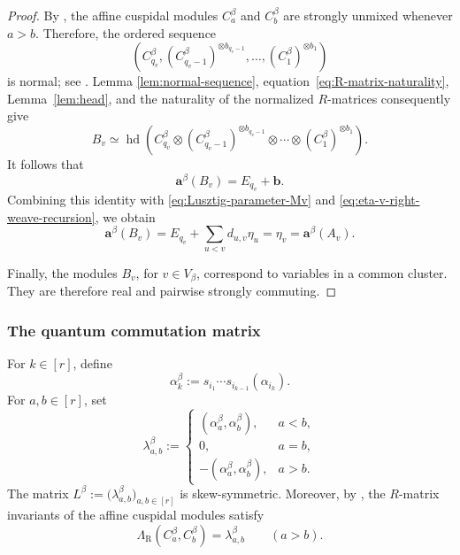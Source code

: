 \documentclass[12pt, reqno]{amsart}
\theoremstyle{plain}
\theoremstyle{definition}
\numberwithin{equation}{section}
\newcommand{\LambdaR}{\Lambda_{\mathrm R}}
\begin{document}
\begin{proof}
By \cite[Theorem~5.16]{kashiwara2025monoidal}, the affine cuspidal
modules \(C_a^\beta\) and \(C_b^\beta\) are strongly unmixed whenever
\(a>b\). Therefore, the ordered sequence
\begin{equation*}
    \left(
        C_{q_v}^\beta,
        (C_{q_v-1}^\beta)^{\otimes b_{q_v-1}},
        \ldots,
        (C_1^\beta)^{\otimes b_1}
    \right)
\end{equation*}
is normal; see
\cite[Proposition~1.14]{kashiwara2025monoidal}. Lemma \ref{lem:normal-sequence}, equation~\eqref{eq:R-matrix-naturality}, Lemma~\ref{lem:head},
and the naturality of the normalized \(R\)-matrices consequently give
\begin{equation}\label{eq:PBW-realization-Bv}
    B_v
    \simeq
    \operatorname{hd}\left(
        C_{q_v}^\beta
        \otimes
        (C_{q_v-1}^\beta)^{\otimes b_{q_v-1}}
        \otimes\cdots\otimes
        (C_1^\beta)^{\otimes b_1}
    \right).
\end{equation}
It follows that
\begin{equation*}
    \mathbf a^\beta(B_v)=E_{q_v}+\mathbf b.
\end{equation*}
Combining this identity with
\eqref{eq:Lusztig-parameter-Mv} and
\eqref{eq:eta-v-right-weave-recursion}, we obtain
\begin{equation*}
    \mathbf a^\beta(B_v)
    =
    E_{q_v}+\sum_{u<v}d_{u,v}\eta_u
    =
    \eta_v
    =
    \mathbf a^\beta(A_v).
\end{equation*}


Finally, the modules \(B_v\), for \(v\in V_\beta\), correspond to
variables in a common cluster. They are therefore real and pairwise
strongly commuting.
\end{proof}

\subsubsection{The quantum commutation matrix}

For \(k\in[r]\), define
\begin{equation*}
    \alpha_k^\beta
    :=
    s_{i_1}\cdots s_{i_{k-1}}(\alpha_{i_k}).
\end{equation*}
For \(a,b\in[r]\), set
\begin{equation}\label{eq:lambda-beta-root-pairing}
    \lambda_{a,b}^\beta
    :=
    \begin{cases}
        (\alpha_a^\beta,\alpha_b^\beta),
            & a<b,\\
        0,
            & a=b,\\
        -(\alpha_a^\beta,\alpha_b^\beta),
            & a>b.
    \end{cases}
\end{equation}
The matrix
\(
    L^\beta
    :=
    \bigl(\lambda_{a,b}^\beta\bigr)_{a,b\in[r]}
\)
is skew-symmetric. Moreover, by \cite[Proposition~5.9]{kashiwara2025monoidal}, the \(R\)-matrix invariants of the affine
cuspidal modules satisfy
\begin{equation}\label{eq:LambdaCa}
    \LambdaR(C_a^\beta,C_b^\beta)
    =
    \lambda_{a,b}^\beta
    \qquad (a>b).
\end{equation}
\end{document}
